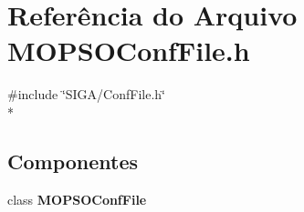 \section{Referência do Arquivo M\+O\+P\+S\+O\+Conf\+File.\+h}
\label{_m_o_p_s_o_conf_file_8h}
{\ttfamily \#include \char`\"{}S\+I\+G\+A/\+Conf\+File.\+h\char`\"{}}\\*
\subsection*{Componentes}
\begin{DoxyCompactItemize}
\item 
class {\bf M\+O\+P\+S\+O\+Conf\+File}
\end{DoxyCompactItemize}
